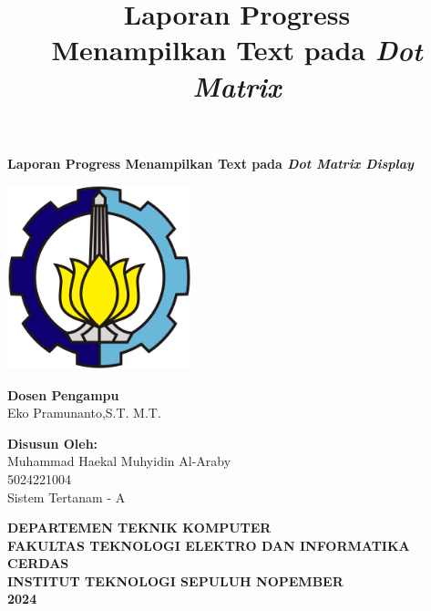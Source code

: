 \documentclass[a4paper,12pt]{article} %
\title{Laporan Progress\\Menampilkan Text pada \textit{Dot Matrix}}
\date{}
\begin{document}
\begin{titlepage}
    \centering
    \vspace*{1cm}
    
     {\Large \textbf{Laporan Progress Menampilkan Text pada \textit{Dot Matrix Display}}}

    \vfill
    \vspace{2cm}

    \includegraphics[width=0.4\textwidth]{./logo.png} %
    \vfill

    \vspace{1cm}
    \begin{onehalfspace}
    \textbf{Dosen Pengampu}\\
    Eko Pramunanto,S.T. M.T.

    \vspace{1cm}

    \textbf{Disusun Oleh:}\\
    Muhammad Haekal Muhyidin Al-Araby\\ 
    5024221004\\
    Sistem Tertanam - A
    \end{onehalfspace}

    \vfill

    \textbf{DEPARTEMEN TEKNIK KOMPUTER\\
    FAKULTAS TEKNOLOGI ELEKTRO DAN INFORMATIKA CERDAS\\
    INSTITUT TEKNOLOGI SEPULUH NOPEMBER\\2024}
\end{titlepage}

\end{document}
